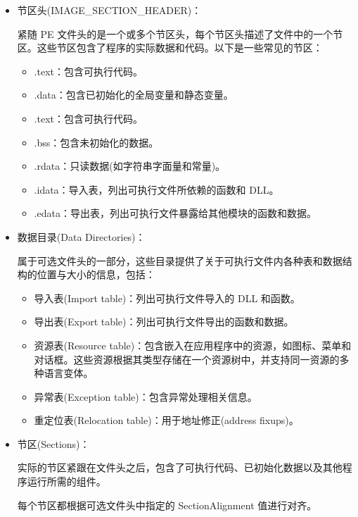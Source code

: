 \begin{itemize}
\item 
节区头(IMAGE\_SECTION\_HEADER)：

紧随 PE 文件头的是一个或多个节区头，每个节区头描述了文件中的一个节区。这些节区包含了程序的实际数据和代码。以下是一些常见的节区：

\begin{itemize}
\item 
.text：包含可执行代码。

\item 
.data：包含已初始化的全局变量和静态变量。

\item 
.text：包含可执行代码。

\item 
.bss：包含未初始化的数据。

\item 
.rdata：只读数据(如字符串字面量和常量)。

\item 
.idata：导入表，列出可执行文件所依赖的函数和 DLL。

\item 
.edata：导出表，列出可执行文件暴露给其他模块的函数和数据。
\end{itemize}

\item 
数据目录(Data Directories)：

属于可选文件头的一部分，这些目录提供了关于可执行文件内各种表和数据结构的位置与大小的信息，包括：

\begin{itemize}
\item 
导入表(Import table)：列出可执行文件导入的 DLL 和函数。

\item 
导出表(Export table)：列出可执行文件导出的函数和数据。

\item 
资源表(Resource table)：包含嵌入在应用程序中的资源，如图标、菜单和对话框。这些资源根据其类型存储在一个资源树中，并支持同一资源的多种语言变体。

\item 
异常表(Exception table)：包含异常处理相关信息。

\item 
重定位表(Relocation table)：用于地址修正(address fixups)。
\end{itemize}

\item 
节区(Sections)：

实际的节区紧跟在文件头之后，包含了可执行代码、已初始化数据以及其他程序运行所需的组件。

每个节区都根据可选文件头中指定的 SectionAlignment 值进行对齐。
\end{itemize}

